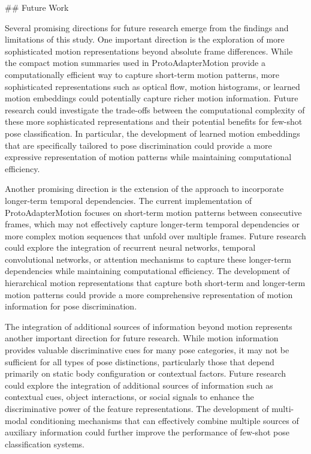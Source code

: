 \documentclass[11pt]{article}
\begin{document}
## Future Work

Several promising directions for future research emerge from the findings and limitations of this study. One important direction is the exploration of more sophisticated motion representations beyond absolute frame differences. While the compact motion summaries used in ProtoAdapterMotion provide a computationally efficient way to capture short-term motion patterns, more sophisticated representations such as optical flow, motion histograms, or learned motion embeddings could potentially capture richer motion information. Future research could investigate the trade-offs between the computational complexity of these more sophisticated representations and their potential benefits for few-shot pose classification. In particular, the development of learned motion embeddings that are specifically tailored to pose discrimination could provide a more expressive representation of motion patterns while maintaining computational efficiency.

Another promising direction is the extension of the approach to incorporate longer-term temporal dependencies. The current implementation of ProtoAdapterMotion focuses on short-term motion patterns between consecutive frames, which may not effectively capture longer-term temporal dependencies or more complex motion sequences that unfold over multiple frames. Future research could explore the integration of recurrent neural networks, temporal convolutional networks, or attention mechanisms to capture these longer-term dependencies while maintaining computational efficiency. The development of hierarchical motion representations that capture both short-term and longer-term motion patterns could provide a more comprehensive representation of motion information for pose discrimination.

The integration of additional sources of information beyond motion represents another important direction for future research. While motion information provides valuable discriminative cues for many pose categories, it may not be sufficient for all types of pose distinctions, particularly those that depend primarily on static body configuration or contextual factors. Future research could explore the integration of additional sources of information such as contextual cues, object interactions, or social signals to enhance the discriminative power of the feature representations. The development of multi-modal conditioning mechanisms that can effectively combine multiple sources of auxiliary information could further improve the performance of few-shot pose classification systems.
\end{document}
